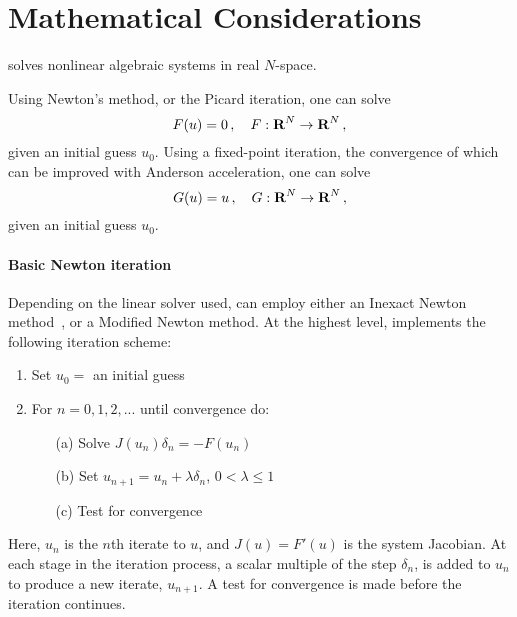 \chapter{Mathematical Considerations}\label{s:math}

{\kinsol} solves nonlinear algebraic systems in real $N$-space.  

Using Newton's method, or the Picard iteration, one can solve
\begin{equation}\label{nonlinear_system}
  F(u) = 0 \, , \quad F:\mbox{\bf R}^N \rightarrow \mbox{\bf R}^N \, ,
\end{equation}
given an initial guess $u_0$.
Using a fixed-point iteration, the convergence of which can be improved with Anderson 
acceleration, one can solve
\begin{equation}\label{fixed-point_system}
  G(u) = u \, , \quad G:\mbox{\bf R}^N \rightarrow \mbox{\bf R}^N \, ,
\end{equation}
given an initial guess $u_0$.



\subsubsection*{Basic Newton iteration}
Depending on the linear solver used, {\kinsol} can employ either an Inexact Newton 
method~\cite{Bro:87,BrSa:90,DES:82,DeSc:96,Kel:95}, or a Modified Newton method.
At the highest level, {\kinsol} implements the following iteration scheme:

\vspace{1ex}
\begin{enumerate}
   \item Set $u_0 = $ an initial guess
   \item For $n = 0, 1, 2,...$ until convergence do:
      \begin{itemize}
          \item[(a)] Solve $J(u_n)\delta_n = -F(u_n)$ \label{e:Newton}
          \item[(b)] Set $u_{n+1} = u_n + \lambda \delta_n$,
          $0 < \lambda \leq 1$
          \item[(c)] Test for convergence
      \end{itemize}
\end{enumerate}
Here, $u_n$ is the $n$th iterate to $u$, and $J(u) = F'(u)$ is the system
Jacobian. At each stage in the iteration process, a scalar multiple of the
step $\delta_n$, is added to $u_n$ to produce a new iterate, $u_{n+1}$.
A test for convergence is made before the iteration continues.


